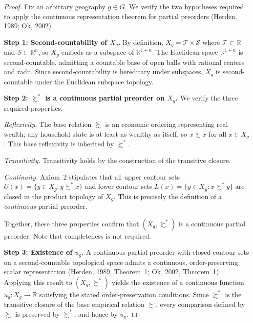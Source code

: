 \documentclass{article}
\begin{document}
\begin{proof}
Fix an arbitrary geography $g \in G$. We verify the two hypotheses required to apply
the continuous representation theorem for partial preorders (Herden, 1989; Ok, 2002).

\medskip
\noindent\textbf{Step 1: Second-countability of $X_g$.}
By definition, $X_g = \mathcal{T} \times \mathcal{S}$ where $\mathcal{T} \subset \mathbb{R}$
and $\mathcal{S} \subset \mathbb{R}^n$, so $X_g$ embeds as a subspace of $\mathbb{R}^{1+n}$.
The Euclidean space $\mathbb{R}^{1+n}$ is second-countable, admitting a countable base of
open balls with rational centers and radii. Since second-countability is hereditary under
subspaces, $X_g$ is second-countable under the Euclidean subspace topology.

\medskip
\noindent\textbf{Step 2: $\succsim^*$ is a continuous partial preorder on $X_g$.}
We verify the three required properties.

\textit{Reflexivity.} The base relation $\succsim$ is an economic ordering representing
real wealth; any household state is at least as wealthy as itself, so $x \succsim x$ for
all $x \in X_g$. This base reflexivity is inherited by $\succsim^*$.

\textit{Transitivity.} Transitivity holds by the construction of the transitive closure.

\textit{Continuity.} Axiom~2 stipulates that all upper contour sets
$U(x) = \{y \in X_g : y \succsim^* x\}$ and lower contour sets
$L(x) = \{y \in X_g : x \succsim^* y\}$ are closed in the product topology of $X_g$.
This is precisely the definition of a \textit{continuous} partial preorder.

Together, these three properties confirm that $(X_g, \succsim^*)$ is a continuous
partial preorder. Note that completeness is not required.

\medskip
\noindent\textbf{Step 3: Existence of $u_g$.}
A continuous partial preorder with closed contour sets on a second-countable topological
space admits a continuous, order-preserving scalar representation (Herden, 1989,
Theorem~1; Ok, 2002, Theorem~1). Applying this result to $(X_g, \succsim^*)$ yields the
existence of a continuous function $u_g : X_g \to \mathbb{R}$ satisfying the stated
order-preservation conditions. Since $\succsim^*$ is the transitive closure of the base
empirical relation $\succsim$, every comparison defined by $\succsim$ is preserved by
$\succsim^*$, and hence by $u_g$.
\end{proof}
\end{document}
